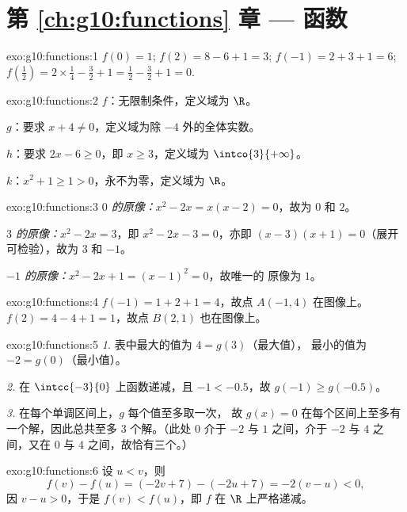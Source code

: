 \section*{第 \ref{ch:g10:functions} 章 --- 函数}

\begin{solution}{exo:g10:functions:1}
$f(0) = 1$; \quad $f(2) = 8 - 6 + 1 = 3$; \quad
$f(-1) = 2 + 3 + 1 = 6$; \quad
$f\!\left(\tfrac12\right) = 2 \times \tfrac14 - \tfrac32 + 1 = \tfrac12 -
\tfrac32 + 1 = 0$.
\end{solution}

\begin{solution}{exo:g10:functions:2}
$f$：无限制条件，定义域为 $\R$。

$g$：要求 $x + 4 \neq 0$，定义域为除 $-4$ 外的全体实数。

$h$：要求 $2x - 6 \geq 0$，即 $x \geq 3$，定义域为
$\intco{3}{+\infty}$。

$k$：$x^2 + 1 \geq 1 > 0$，永不为零，定义域为 $\R$。
\end{solution}

\begin{solution}{exo:g10:functions:3}
\emph{$0$ 的原像：}$x^2 - 2x = x(x-2) = 0$，故为 $0$ 和 $2$。

\emph{$3$ 的原像：}$x^2 - 2x = 3$，即 $x^2 - 2x - 3 = 0$，亦即
$(x-3)(x+1) = 0$（展开可检验），故为 $3$ 和 $-1$。

\emph{$-1$ 的原像：}$x^2 - 2x + 1 = (x - 1)^2 = 0$，故唯一的
原像为 $1$。
\end{solution}

\begin{solution}{exo:g10:functions:4}
$f(-1) = 1 + 2 + 1 = 4$，故点 $A(-1, 4)$ 在图像上。
$f(2) = 4 - 4 + 1 = 1$，故点 $B(2, 1)$ 也在图像上。
\end{solution}

\begin{solution}{exo:g10:functions:5}
\emph{1.} 表中最大的值为 $4 = g(3)$（最大值），
最小的值为 $-2 = g(0)$（最小值）。

\emph{2.} 在 $\intcc{-3}{0}$ 上函数递减，且
$-1 < -0.5$，故 $g(-1) \geq g(-0.5)$。

\emph{3.} 在每个单调区间上，$g$ 每个值至多取一次，
故 $g(x) = 0$ 在每个区间上至多有一个解，因此总共至多 $3$
个解。（此处 $0$ 介于 $-2$ 与 $1$ 之间，介于 $-2$ 与
$4$ 之间，又在 $0$ 与 $4$ 之间，故恰有三个。）
\end{solution}

\begin{solution}{exo:g10:functions:6}
设 $u < v$，则
\[
f(v) - f(u) = (-2v + 7) - (-2u + 7) = -2(v - u) < 0,
\]
因 $v - u > 0$，于是 $f(v) < f(u)$，即 $f$ 在 $\R$ 上严格递减。
\end{solution}

